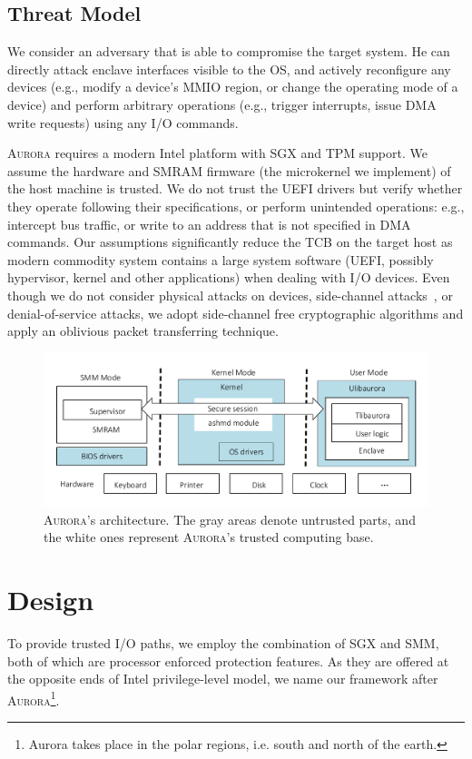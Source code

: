 \subsection{Threat Model}
We consider an adversary that is able to compromise the target system. He can directly attack enclave interfaces visible to the OS, and actively reconfigure any devices (e.g., modify a device’s MMIO region, or change the operating mode of a device) and perform arbitrary operations (e.g., trigger interrupts, issue DMA write requests) using any I/O commands.

\textsc{Aurora} requires a modern Intel platform with SGX and TPM support. We assume the hardware and SMRAM firmware (the microkernel we implement) of the host machine is trusted. We do not trust the UEFI drivers but verify whether they operate following their specifications, or perform unintended operations: e.g., intercept bus traffic, or write to an address that is not specified in DMA commands. Our assumptions significantly reduce the TCB on the target host as modern commodity system contains a large system software (UEFI, possibly hypervisor, kernel and other applications) when dealing with I/O devices.
Even though we do not consider physical attacks on devices, side-channel attacks~\cite{chen2019sgxpectre, ridl}, or denial-of-service attacks, we adopt side-channel free cryptographic algorithms and apply an oblivious packet transferring technique.

\begin{figure}[t]
	\centering
	\includegraphics[height=0.2\textheight]{figures/arch.pdf}
	\caption{\textsc{Aurora}'s architecture. The gray areas denote untrusted parts, and the white ones represent \textsc{Aurora}'s trusted computing base.}
	\label{fig:architecture}
\end{figure}


\section{Design}
To provide trusted I/O paths, we employ the combination of SGX and SMM, both of which are processor enforced protection features. As they are offered at the opposite ends of Intel privilege-level model, we name our framework after \textsc{Aurora}\footnote{Aurora takes place in the polar regions, i.e. south and north of the earth.}.

